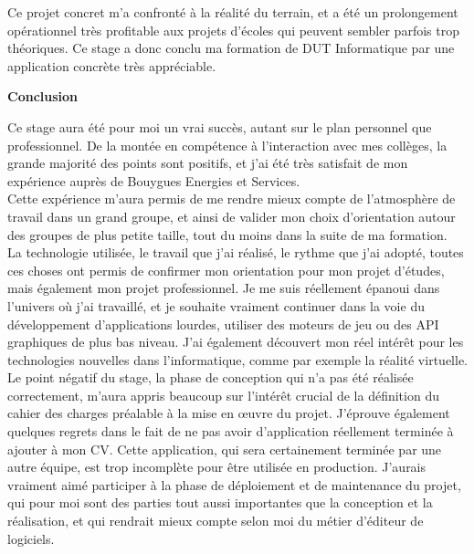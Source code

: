 \documentclass[a4paper]{article}
\begin{document}
    Ce projet concret m'a confronté à la réalité du terrain, et a été un prolongement opérationnel très profitable aux projets d'écoles qui peuvent sembler parfois trop théoriques. Ce stage a donc conclu ma formation de DUT Informatique par une application concrète très appréciable. \\

    \newpage

    \huge \textbf{Conclusion} \vspace{5pt} \\
   \normalsize
   
    Ce stage aura été pour moi un vrai succès, autant sur le plan personnel que professionnel. De la montée en compétence à l'interaction avec mes collèges, la grande majorité des points sont positifs, et j'ai été très satisfait de mon expérience auprès de Bouygues Energies et Services. \\

    Cette expérience m'aura permis de me rendre mieux compte de l'atmosphère de travail dans un grand groupe, et ainsi de valider mon choix d'orientation autour des groupes de plus petite taille, tout du moins dans la suite de ma formation. \\

    La technologie utilisée, le travail que j'ai réalisé, le rythme que j'ai adopté, toutes ces choses ont permis de confirmer mon orientation pour mon projet d'études, mais également mon projet professionnel. Je me suis réellement épanoui dans l'univers où j'ai travaillé, et je souhaite vraiment continuer dans la voie du développement d'applications lourdes, utiliser des moteurs de jeu ou des API graphiques de plus bas niveau. J'ai également découvert mon réel intérêt pour les technologies nouvelles dans l'informatique, comme par exemple la réalité virtuelle. \\

    Le point négatif du stage, la phase de conception qui n'a pas été réalisée correctement, m'aura appris beaucoup sur l'intérêt crucial de la définition du cahier des charges préalable à la mise en œuvre du projet. J'éprouve également quelques regrets dans le fait de ne pas avoir d'application réellement terminée à ajouter à mon CV. Cette application, qui sera certainement terminée par une autre équipe, est trop incomplète pour être utilisée en production. J'aurais vraiment aimé participer à la phase de déploiement et de maintenance du projet, qui pour moi sont des parties tout aussi importantes que la conception et la réalisation, et qui rendrait mieux compte selon moi du métier d'éditeur de logiciels. \\
\end{document}
